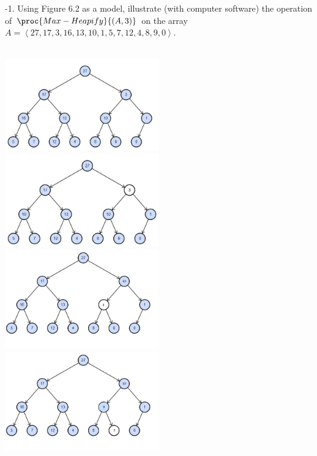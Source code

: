 \documentclass[addpoints,11pt]{exam}
\begin{document}
\begin{questions}
\ifprintanswers
\newpage
\else
\bigskip
\fi


%
%
-1.  Using Figure 6.2 as a model, illustrate (with computer software) the operation of $\proc{Max-Heapify}{(A,3)}$ on the array $A = \left< 27, 17, 3, 16, 13, 10, 1, 5, 7, 12, 4, 8, 9, 0\right>$.

\begin{solutionorbox} \\
	\includegraphics[width=0.5\textwidth]{step1.JPG}
	\includegraphics[width=0.5\textwidth]{step2.jpg}
	\includegraphics[width=0.5\textwidth]{step3.jpg}
	\includegraphics[width=0.5\textwidth]{step4.jpg}
\end{solutionorbox}


\end{questions}
\end{document}
